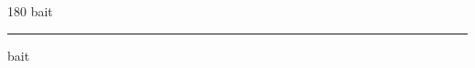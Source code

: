 
\begin{frame}
\begin{center}
\begin{turn}{180}
{\fontsize{2.5cm}{1em}\selectfont bait}
\end{turn}
\vspace{1em}\par  
\hrule
\vspace{1em}\par  
{\fontsize{2.5cm}{1em}\selectfont bait}
\end{center}
\end{frame}
